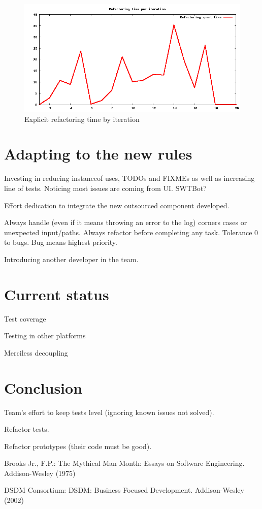\documentclass[lnbip]{svmultln}
\begin{document}
\begin{figure}[hbt]
  \centerline{
    \includegraphics[width=120mm]{refactoring.png}
  }
  \caption{Explicit refactoring time by iteration}
  \label{fig:refactoring}
\end{figure}

\section{Adapting to the new rules}
\label{sec:adapting}

Investing in reducing instanceof uses, TODOs and FIXMEs as well as
increasing line of tests. Noticing most issues are coming from
UI. SWTBot?

Effort dedication to integrate the new outsourced component developed.

Always handle (even if it means throwing an error to the log) corners
cases or unexpected input/paths. Always refactor before completing any
task. Tolerance 0 to bugs. Bug means highest priority.

Introducing another developer in the team.

\section{Current status}
\label{sec:nowadays}

Test coverage

Testing in other platforms

Merciless decoupling

\section{Conclusion}
\label{sec:conclusion}

Team's effort to keep tests level (ignoring known issues not solved).

Refactor tests.

Refactor prototypes (their code must be good).



%
%
\begin{thebibliography}{5}

 Brooks Jr., F.P.: The Mythical Man Month: Essays
  on Software Engineering. Addison-Wesley (1975)

 DSDM Consortium: DSDM: Business Focused Development. Addison-Wesley (2002)

\end{thebibliography}
%
\end{document}
